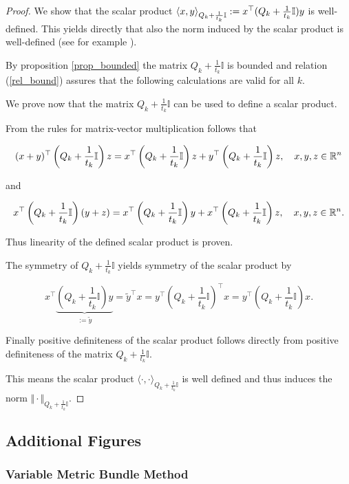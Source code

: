 \begin{proof}
	We show that the scalar product \(\left\langle x,y \right\rangle_{Q_k+\frac{1}{t_k}\mathbb{I}} := x^{\top} (Q_k+\frac{1}{t_k}\mathbb{I})y\) is well-defined.
	This yields directly that also the norm induced by the scalar product is well-defined (see for example \cite[Corollary 12.6, p. 172]{Liesen2015}).
	
	By proposition \ref{prop_bounded} the matrix \(Q_k+\frac{1}{t_k}\mathbb{I}\) is bounded and relation (\ref{rel_bound}) assures that the following calculations are valid for all \(k\).
	
	We prove now that the matrix \(Q_k+\frac{1}{t_k}\mathbb{I}\) can be used to define a scalar product.
	
From the rules for matrix-vector multiplication follows that

\[ (x+y)^{\top}\left(Q_k+\frac{1}{t_k}\mathbb{I}\right)z = x^{\top}\left(Q_k+\frac{1}{t_k}\mathbb{I}\right)z + y^{\top}\left(Q_k+\frac{1}{t_k}\mathbb{I}\right)z, \quad x,y,z \in \mathbb{R}^n\]

and 

\[ x^{\top}\left(Q_k+\frac{1}{t_k}\mathbb{I}\right)(y+z) = x^{\top}\left(Q_k+\frac{1}{t_k}\mathbb{I}\right)y + x^{\top}\left(Q_k+\frac{1}{t_k}\mathbb{I}\right)z, \quad x,y,z \in \mathbb{R}^n.\]

Thus linearity of the defined scalar product is proven.

The symmetry of \(Q_k+\frac{1}{t_k}\mathbb{I}\) yields symmetry of the scalar product by

\[ x^{\top} \underbrace{\left(Q_k+\frac{1}{t_k}\mathbb{I}\right)y}_{:=\tilde{y}} = \tilde{y}^{\top}x = y^{\top}\left(Q_k+\frac{1}{t_k}\mathbb{I}\right)^{\top}x = y^{\top}\left(Q_k+\frac{1}{t_k}\mathbb{I}\right)x.   \]

Finally positive definiteness of the scalar product follows directly from positive definiteness of the matrix \(Q_k+\frac{1}{t_k}\mathbb{I}\).

This means the scalar product \(\langle \cdot,\cdot \rangle_{Q_k+\frac{1}{t_k}\mathbb{I}}\) is well defined and thus induces the norm \(\Vert \cdot \Vert_{Q_k+\frac{1}{t_k}\mathbb{I}}\).
\end{proof}


\subsection{Additional Figures}

\subsubsection{Variable Metric Bundle Method}

